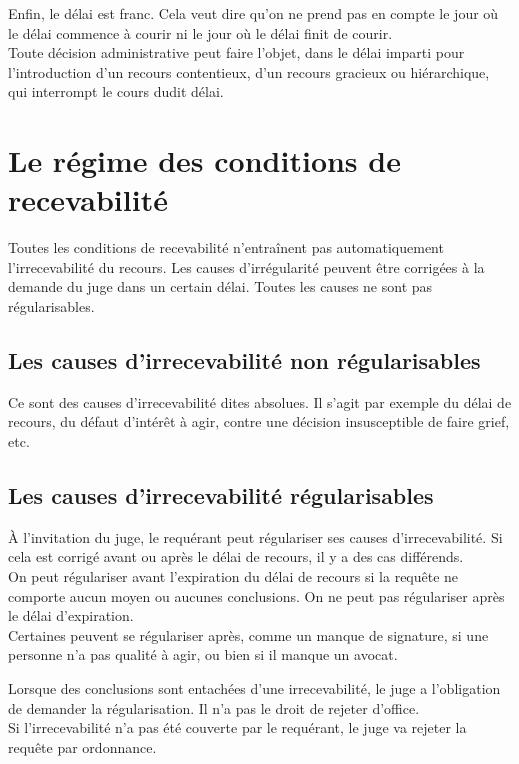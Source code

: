 \documentclass[10pt, a4paper, openany]{book}
\begin{document}
Enfin, le délai est franc. Cela veut dire qu'on ne prend pas en compte le jour où le délai commence à courir ni le jour où le délai finit de courir. \\
Toute décision administrative peut faire l'objet, dans le délai imparti pour l'introduction d'un recours contentieux, d'un recours gracieux ou hiérarchique, qui interrompt le cours dudit délai.

\section{Le régime des conditions de recevabilité}

Toutes les conditions de recevabilité n'entraînent pas automatiquement l'irrecevabilité du recours. Les causes d'irrégularité peuvent être corrigées à la demande du juge dans un certain délai. Toutes les causes ne sont pas régularisables. \\

\subsection{Les causes d'irrecevabilité non régularisables}

Ce sont des causes d'irrecevabilité dites absolues. Il s'agit par exemple du délai de recours, du défaut d'intérêt à agir, contre une décision insusceptible de faire grief, etc. 

\subsection{Les causes d'irrecevabilité régularisables}

À l'invitation du juge, le requérant peut régulariser ses causes d'irrecevabilité. Si cela est corrigé avant ou après le délai de recours, il y a des cas différends. \\
On peut régulariser avant l'expiration du délai de recours si la requête ne comporte aucun moyen ou aucunes conclusions. On ne peut pas régulariser après le délai d'expiration. \\
Certaines peuvent se régulariser après, comme un manque de signature, si une personne n'a pas qualité à agir, ou bien si il manque un avocat. 


Lorsque des conclusions sont entachées d'une irrecevabilité, le juge a l'obligation de demander la régularisation. Il n'a pas le droit de rejeter d'office. \\
Si l'irrecevabilité n'a pas été couverte par le requérant, le juge va rejeter la requête par ordonnance. 
\end{document}
